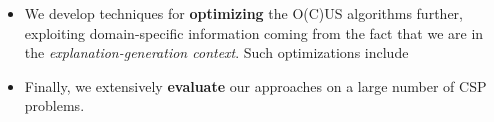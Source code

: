 \documentclass[twoside,11pt]{article}
\newcommand\comment[1]{\marginpar{\tiny #1}}
\renewcommand\comment[1]{#1}
\newcommand{\tias}[1]{{\comment{\color{blue}Tias:#1}}}
\newcommand{\emilio}[1]{{\comment{\color{red}Emilio: #1}}}
\newcommand{\bart}[1]{{\comment{\color{OliveGreen}Bart: #1}}}
\newcommand\mm[1]{\ensuremath{#1}\xspace}
\newcommand\call[1]{\mm{\texttt{#1}}}
\newcommand\grow{\mm{\call{Grow}}}
\begin{document}
\begin{itemize}
\item We develop techniques for \textbf{optimizing} the O(C)US algorithms further, exploiting domain-specific information coming from the fact that we are in the \emph{explanation-generation context}. Such optimizations include 
%
 

\item Finally, we extensively \textbf{evaluate} our approaches on a large number of CSP problems.

\end{itemize}
\end{document}
